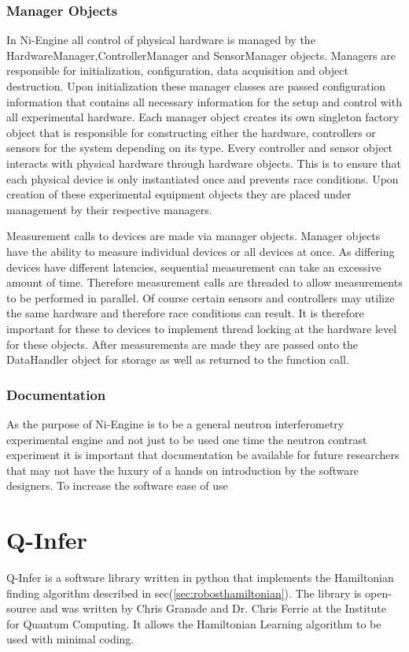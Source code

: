 \subsubsection{Manager Objects}
In Ni-Engine all control of physical hardware is managed by the HardwareManager,ControllerManager and SensorManager objects. Managers are responsible for initialization, configuration, data acquisition and object destruction. Upon initialization these manager classes are passed configuration information that contains all necessary information for the setup and control with all experimental hardware. Each manager object creates its own singleton factory object that is responsible for constructing either the hardware, controllers or sensors for the system depending on its type. Every controller and sensor object interacts with physical hardware through hardware objects. This is to ensure that each physical device is only instantiated once and prevents race conditions. Upon creation of these experimental equipment objects they are placed under management by their respective managers. 

Measurement calls to devices are made via manager objects. Manager objects have the ability to measure individual devices or all devices at once. As differing devices have different latencies, sequential measurement can take an excessive amount of time. Therefore measurement calls are threaded to allow measurements to be performed in parallel. Of course certain sensors and controllers may utilize the same hardware and therefore race conditions can result. It is therefore important for these to devices to implement thread locking at the hardware level for these objects. After measurements are made they are passed onto the DataHandler object for storage as well as returned to the function call. 
\subsubsection{Documentation}
As the purpose of Ni-Engine is to be a general neutron interferometry experimental engine and not just to be used one time the neutron contrast experiment it is important that documentation be available for future researchers that may not have the luxury of a hands on introduction by the software designers. To increase the software ease of use

\section{Q-Infer}
Q-Infer is a software library written in python that implements the Hamiltonian finding algorithm described in sec(\ref{sec:robosthamiltonian}).\cite{qinfer} The library is open-source and was written by Chris Granade and Dr. Chris Ferrie at the Institute for Quantum Computing. It allows the Hamiltonian Learning algorithm to be used with minimal coding.
